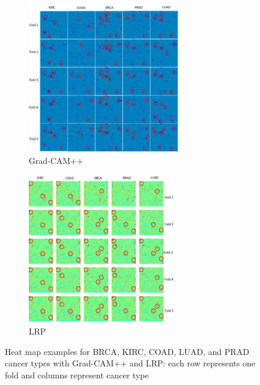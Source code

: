 \begin{figure}
	\centering
	\begin{subfigure}{.48\linewidth}
		\centering
		\includegraphics[width=1.1\linewidth,height=65mm]{images/gcam+.png}
		\caption{Grad-CAM++}
        \label{fig:hm_gcam++}
	\end{subfigure}
	\begin{subfigure}{0.48\linewidth}
		\centering
		\includegraphics[width=1.1\linewidth,height=65mm]{images/lrp.png}
		\caption{LRP}
        \label{fig:lrp}
	\end{subfigure}
	\caption{Heat map examples for BRCA, KIRC, COAD, LUAD, and PRAD cancer types with Grad-CAM++ and LRP: each row represents one fold and columns represent cancer type} 
	\label{fig:hm_all}
	\vspace{-2mm}
\end{figure}

